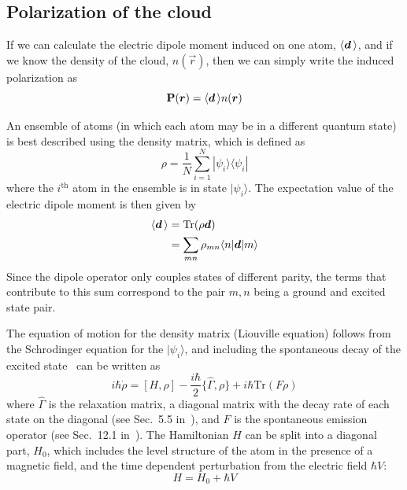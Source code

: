      
    
\subsection{Polarization of the cloud}  


If we can calculate the electric
dipole moment induced on one atom, $\langle \bm{d}\, \rangle$, and if we know
the density of the cloud, $n(\vec{r})$, then we can simply write the induced
polarization as 
\begin{equation}
 \bm{\mathrm{P}}(\bm{r}) = \langle \bm{d}\, \rangle n(\bm{r}) 
\end{equation}

An ensemble of atoms (in which each atom may be in a different quantum state) is
best described using the density matrix, which is defined as \begin{equation}
  \rho = \frac{1}{N} \sum_{i=1}^{N} | \psi_{i} \rangle \langle \psi_{i} | 
\end{equation}
where the $i^{\text{th}}$ atom in the ensemble is in state $|\psi_{i}\rangle$.
The expectation value of the electric dipole moment is then given by 
\begin{equation}
\begin{split}
   \langle \bm{d}\, \rangle  & = \text{Tr} ( \rho \bm{d} )  \\
   & = \sum_{mn} \rho_{mn} \langle n | \bm{d} | m \rangle
\end{split} 
\end{equation} 
Since the dipole operator only couples states of different parity, the terms
that contribute to this sum correspond to the pair $m,n$ being a ground and
excited state pair.   

The equation of motion for the density matrix (Liouville equation) follows from
the Schrodinger equation for the $|\psi_{i}\rangle$, and including the
spontaneous decay of the excited state~\cite{auzinsh2010optically} can be
written as
\begin{equation}
  i \hbar \dot{\rho} = 
  [H, \rho] - \frac{i\hbar}{2}\lbrace \hat{\Gamma}, \rho \rbrace + i\hbar\text{Tr}( F \rho ) 
\end{equation}
where $\hat{\Gamma}$ is the relaxation matrix, a diagonal matrix with the decay
rate of each state on the diagonal (see Sec.~5.5
in~\cite{auzinsh2010optically}), and $F$ is the spontaneous emission operator
(see Sec.~12.1 in~\cite{auzinsh2010optically}).  The Hamiltonian
$H$ can be split into a diagonal part, $H_{0}$, which includes the
level structure of the atom in the presence of a magnetic field, and the time
dependent perturbation from the electric field $\hbar V$:
\begin{equation}
  H = H_{0} + \hbar V
\end{equation}

